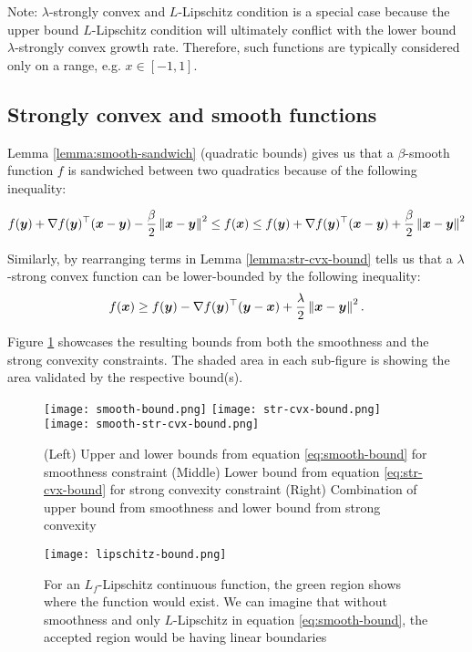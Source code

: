\documentclass{article}
\begin{document}
{Note: $\lambda$-strongly convex and $L$-Lipschitz condition is a special case because the upper bound $L$-Lipschitz condition will ultimately conflict with the lower bound $\lambda$-strongly convex growth rate. Therefore, such functions are typically considered only on a range, e.g. $x \in [-1,1]$.


\subsection{Strongly convex and smooth functions}
Lemma \ref{lemma:smooth-sandwich} (quadratic bounds) gives us that a $\beta$-smooth function $f$ is sandwiched between two quadratics because of the following inequality:

\begin{equation}\label{eq:smooth-bound}
    f({\bm{y}}) + \nabla f({\bm{y}})^\top ({\bm{x}}-{\bm{y}}) - \frac{\beta}{2} \left\|{\bm{x}}-{\bm{y}}\right\|^2 \leq f({\bm{x}}) \leq f({\bm{y}}) + \nabla f({\bm{y}})^\top ({\bm{x}}-{\bm{y}}) + \frac{\beta}{2} \left\|{\bm{x}}-{\bm{y}}\right\|^2
\end{equation}

Similarly, by rearranging terms in Lemma \ref{lemma:str-cvx-bound} tells us that a $\lambda$-strong convex function can be lower-bounded by the following inequality:
\begin{equation}\label{eq:str-cvx-bound}
    f({\bm{x}}) \geq f({\bm{y}}) - \nabla f({\bm{y}})^\top ({\bm{y}}-{\bm{x}}) + \frac{\lambda}{2} \left\|{\bm{x}} - {\bm{y}}\right\|^2.
\end{equation}

Figure \ref{fig:bounds} showcases the resulting bounds from both the smoothness and the strong convexity constraints. The shaded area in each sub-figure is showing the area validated by the respective bound(s).

\begin{figure}[ht]
    \texttt{[image: smooth-bound.png]}\hfill
    \texttt{[image: str-cvx-bound.png]}\hfill
    \texttt{[image: smooth-str-cvx-bound.png]}

    \caption{(Left) Upper and lower bounds from equation \ref{eq:smooth-bound} for smoothness constraint (Middle) Lower bound from equation \ref{eq:str-cvx-bound} for strong convexity constraint (Right) Combination of upper bound from smoothness and lower bound from strong convexity}
    \label{fig:bounds}
\end{figure}

\begin{figure}[h]
\centering
    \texttt{[image: lipschitz-bound.png]}
    \caption{For an $L_f$-Lipschitz continuous function, the green region shows where the function would exist. We can imagine that without smoothness and only $L$-Lipschitz in equation \ref{eq:smooth-bound}, the accepted region would be having linear boundaries}
    \label{fig:accepted-reg}
\end{figure}


}
\end{document}
